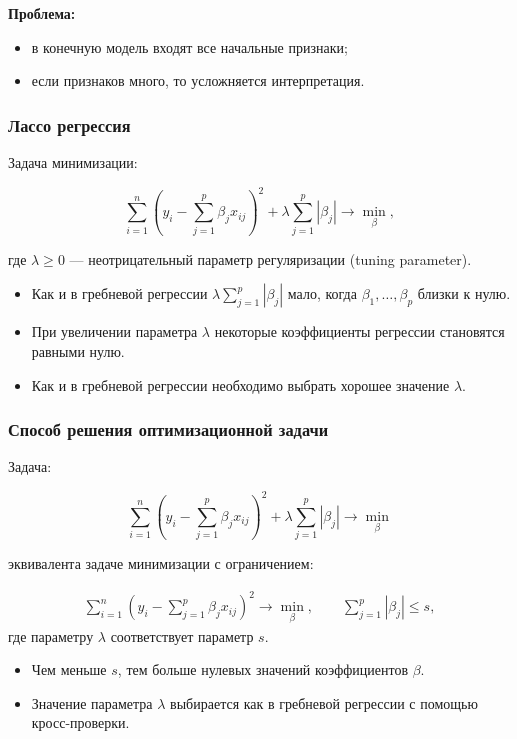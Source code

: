 \documentclass[unicode, notheorems]{beamer}
\begin{document}
\begin{frame}
\begin{frame}
\textbf{Проблема:} 
\begin{itemize}
\item в конечную модель входят все начальные признаки;
\item если признаков много, то усложняется интерпретация.
\end{itemize}

\end{frame}




\begin{frame}
\frametitle{Лассо регрессия}


Задача минимизации:


\[\sum_{i=1}^n(y_i - \sum_{j=1}^p \beta_j x_{ij})^2 + \lambda \sum_{j = 1}^p |\beta_j| \rightarrow \min_{\beta},\]

где $\lambda \geq 0$ --- неотрицательный параметр регуляризации (tuning parameter).

\begin{itemize}
\item Как и в гребневой регрессии $\lambda \sum_{j = 1}^p |\beta_j|$ мало, когда $\beta_1, \ldots, \beta_p$ близки к нулю.
\item При увеличении параметра $\lambda$ некоторые коэффициенты регрессии становятся равными нулю.
\item Как и в гребневой регрессии необходимо выбрать хорошее значение $\lambda$.
\end{itemize}

\end{frame}







\begin{frame}
\frametitle{Способ решения оптимизационной задачи}
Задача:

\[\sum_{i=1}^n(y_i - \sum_{j=1}^p \beta_j x_{ij})^2 + \lambda \sum_{j = 1}^p |\beta_j| \rightarrow \min_{\beta}\]

эквивалента задаче минимизации с ограничением:

\begin{align*}
\sum_{i=1}^n(y_i - \sum_{j=1}^p \beta_j x_{ij})^2 \rightarrow \min_{\beta}, \qquad  \sum_{j = 1}^p |\beta_j| \leq s,
\end{align*}
где параметру $\lambda$ соответствует параметр $s$.

\begin{itemize}
\item Чем меньше $s$, тем больше нулевых значений коэффициентов $\beta$.
\item Значение параметра $\lambda$ выбирается как в гребневой регрессии с помощью кросс-проверки.
\end{itemize}


\end{frame}
\end{frame}
\end{document}
